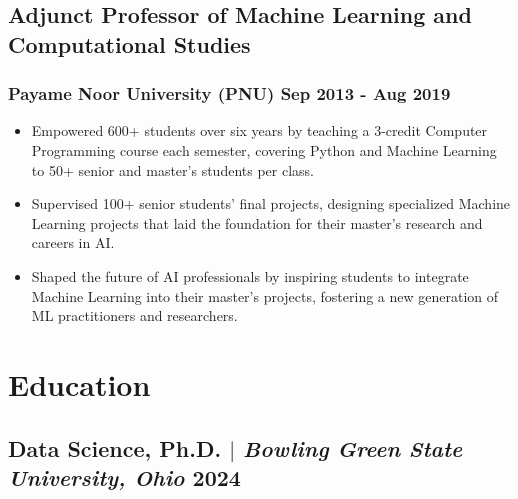 \documentclass[11pt]{article} %
\begin{document}
\subsection{Adjunct Professor of Machine Learning and Computational Studies}
\subsubsection{Payame Noor University (PNU) \hfill Sep 2013 - Aug 2019}
\begin{itemize}
	\item Empowered 600+ students over six years by teaching a 3-credit Computer Programming course each semester, covering Python and Machine Learning to 50+ senior and master's students per class.
	\item Supervised 100+ senior students' final projects, designing specialized Machine Learning projects that laid the foundation for their master's research and careers in AI.
	\item Shaped the future of AI professionals by inspiring students to integrate Machine Learning into their master's projects, fostering a new generation of ML practitioners and researchers.
\end{itemize}

\section{Education}
\subsection{Data Science, Ph.D. $|$ {\normalfont\itshape Bowling Green State University, Ohio } \hfill 2024} 
\vspace{1em}

\end{document}
